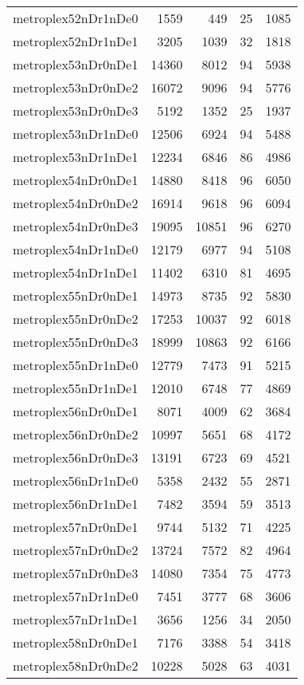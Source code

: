 \documentclass[../../../thesis.tex]{subfiles}
\begin{document}
\begin{longtable}{lrrrr}
metroplex52nDr1nDe0 & 1559 & 449 & 25 & 1085 \\
metroplex52nDr1nDe1 & 3205 & 1039 & 32 & 1818 \\
metroplex53nDr0nDe1 & 14360 & 8012 & 94 & 5938 \\
metroplex53nDr0nDe2 & 16072 & 9096 & 94 & 5776 \\
metroplex53nDr0nDe3 & 5192 & 1352 & 25 & 1937 \\
metroplex53nDr1nDe0 & 12506 & 6924 & 94 & 5488 \\
metroplex53nDr1nDe1 & 12234 & 6846 & 86 & 4986 \\
metroplex54nDr0nDe1 & 14880 & 8418 & 96 & 6050 \\
metroplex54nDr0nDe2 & 16914 & 9618 & 96 & 6094 \\
metroplex54nDr0nDe3 & 19095 & 10851 & 96 & 6270 \\
metroplex54nDr1nDe0 & 12179 & 6977 & 94 & 5108 \\
metroplex54nDr1nDe1 & 11402 & 6310 & 81 & 4695 \\
metroplex55nDr0nDe1 & 14973 & 8735 & 92 & 5830 \\
metroplex55nDr0nDe2 & 17253 & 10037 & 92 & 6018 \\
metroplex55nDr0nDe3 & 18999 & 10863 & 92 & 6166 \\
metroplex55nDr1nDe0 & 12779 & 7473 & 91 & 5215 \\
metroplex55nDr1nDe1 & 12010 & 6748 & 77 & 4869 \\
metroplex56nDr0nDe1 & 8071 & 4009 & 62 & 3684 \\
metroplex56nDr0nDe2 & 10997 & 5651 & 68 & 4172 \\
metroplex56nDr0nDe3 & 13191 & 6723 & 69 & 4521 \\
metroplex56nDr1nDe0 & 5358 & 2432 & 55 & 2871 \\
metroplex56nDr1nDe1 & 7482 & 3594 & 59 & 3513 \\
metroplex57nDr0nDe1 & 9744 & 5132 & 71 & 4225 \\
metroplex57nDr0nDe2 & 13724 & 7572 & 82 & 4964 \\
metroplex57nDr0nDe3 & 14080 & 7354 & 75 & 4773 \\
metroplex57nDr1nDe0 & 7451 & 3777 & 68 & 3606 \\
metroplex57nDr1nDe1 & 3656 & 1256 & 34 & 2050 \\
metroplex58nDr0nDe1 & 7176 & 3388 & 54 & 3418 \\
metroplex58nDr0nDe2 & 10228 & 5028 & 63 & 4031 \\

\end{longtable}
\end{document}
